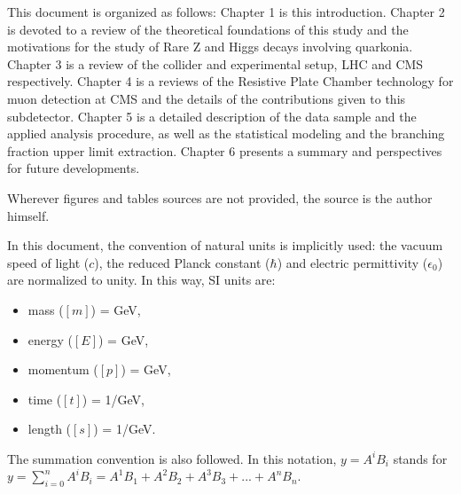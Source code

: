 This document is organized as follows: Chapter 1 is this introduction. Chapter 2 is devoted to a review of the theoretical foundations of this study and the motivations for the study of Rare Z and Higgs decays involving quarkonia. Chapter 3 is a review of the collider and experimental setup, LHC and CMS respectively. Chapter 4 is a reviews of the Resistive Plate Chamber technology for muon detection at CMS and the details of the contributions given to this subdetector. Chapter 5 is a detailed description of the data sample and the applied analysis procedure, as well as the statistical modeling and the branching fraction upper limit extraction. Chapter 6 presents a summary and perspectives for future developments.

Wherever figures and tables sources are not provided, the source is the author himself.

In this document, the convention of natural units is implicitly used: the vacuum speed of light ($c$), the reduced Planck constant ($\hbar$) and electric permittivity ($\epsilon_{0}$) are normalized to unity. In this way, SI units are:
\begin{itemize}
    \setlength\itemsep{-0.5em}
    \item mass ($[m]$) = GeV,
    \item energy ($[E]$) = GeV,
    \item momentum ($[p]$) = GeV,
    \item time ($[t]$) = 1/GeV,
    \item length ($[s]$) = 1/GeV.
\end{itemize}

The summation convention is also followed. In this notation, $y = A^i B_i$ stands for $y = \sum_{i=0}^n A^i B_i = A^1 B_1 + A^2 B_2 + A^3 B_3 + ... + A^n B_n$.